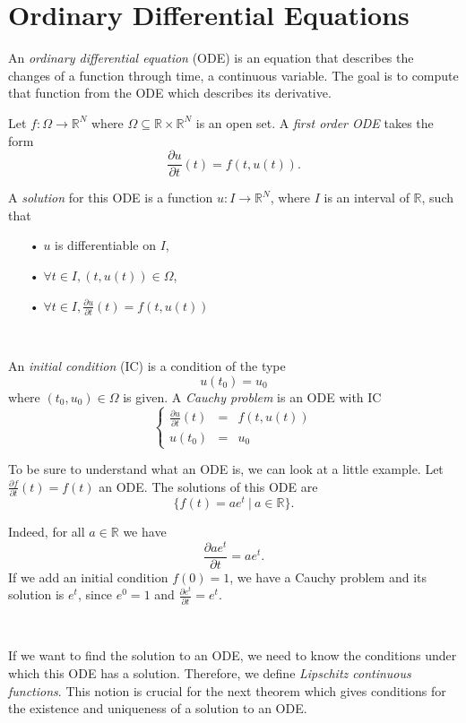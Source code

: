 \documentclass[10pt,a4paper]{article}
\theoremstyle{definition}
\theoremstyle{plain}
\begin{document}
\section{Ordinary Differential Equations}

An\textit{ ordinary differential equation} (ODE) \cite{9} is an equation that describes the changes of a function through time, a continuous variable. The goal is to compute that function from the ODE which describes its derivative.

Let $f: \Omega \rightarrow \mathbb{R}^N$ where $\Omega \subseteq \mathbb{R} \times \mathbb{R}^N$ is an open set. A \textit{first order ODE} takes the form
$$
\frac{\partial u}{\partial t}(t) = f(t,u(t)).
$$

A \textit{solution} for this ODE is a function $u : I \rightarrow \mathbb{R}^N$, where $I$ is an interval of $\mathbb{R}$, such that
	\begin{itemize}
	\item[•] $u$ is differentiable on $I$,
	\item[•] $\forall t \in I, (t, u(t)) \in \Omega$,
	\item[•] $\forall t \in I, \frac{\partial u}{\partial t}(t) = f(t, u(t))$
	\end{itemize}
~

An \textit{initial condition} (IC) is a condition of the type
$$
u(t_0) = u_0
$$
where $(t_0, u_0) \in \Omega$ is given. A \textit{Cauchy problem} is an ODE with IC
$$
\left \{
\begin{array}{rcl}
\frac{\partial u}{\partial t}(t) & = & f(t, u(t)) \\
u(t_0) & = & u_0
\end{array}
\right.
$$

To be sure to understand what an ODE is, we can look at a little example.
Let $\frac{\partial f}{\partial t}(t) = f(t)$ an ODE. The solutions of this ODE are
$$
\{ f(t) = ae^t\ |\ a\in \mathbb{R}\}.
$$

Indeed, for all $a \in \mathbb{R}$ we have
$$
\frac{\partial ae^t}{\partial t} = ae^t.
$$
If we add an initial condition $f(0) = 1$, we have a Cauchy problem and its solution is $e^t$, since $e^0 = 1$ and $\frac{\partial e^t}{\partial t} = e^t$.

~

If we want to find the solution to an ODE, we need to know the conditions under which this ODE has a solution. Therefore, we define \textit{Lipschitz continuous functions}. This notion is crucial for the next theorem which gives conditions for the existence and uniqueness of a solution to an ODE.
\end{document}

